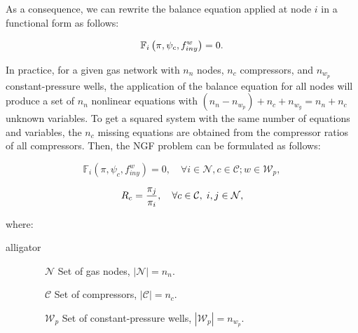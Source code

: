 As a consequence, we can rewrite the balance equation applied at node $i$ in a functional form as follows:

\begin{equation}
	\label{eq:balance_eq_funtional}
	\mathbb{F}_i\left(\pi,\psi_c,f_{iny}^{w}\right) = 0.
	\vspace{0.3cm}
\end{equation}

In practice, for a given gas network with $n_n$ nodes, $n_c$ compressors, and $n_{w_p}$ constant-pressure wells, the application of the balance equation for all nodes will produce a set of $n_n$ nonlinear equations with $(n_n-n_{w_p})+n_c+n_{w_g} = n_n+n_c$ unknown variables. To get a squared system with the same number of equations and variables, the $n_c$ missing equations are obtained from the compressor ratios of all compressors. Then, the NGF problem can be formulated as follows:

\begin{equation}
	\label{eq:F_i=0}
	\mathbb{F}_i\left(\pi,\psi_c,f_{iny}^{w}\right) = 0, \quad \forall i\in\mathcal{N}, c\in\mathcal{C}; w\in\mathcal{W}_p, 	
\end{equation}

\begin{equation}
	\label{eq:R_c=0}
	R_c = \frac{\pi_j}{\pi_i}, \quad \forall c\in\mathcal{C}, \;  i,j\in\mathcal{N},
	\vspace{0.3cm}
\end{equation}

where:

\begin{labeling}{alligator}
	\item [$\qquad \qquad  \mathcal{N}$]  \hspace{0.85cm} Set of gas nodes, $|\mathcal{N}|=n_n$.
	\item [$\qquad \qquad  \mathcal{C}$]  \hspace{1cm} Set of compressors, $|\mathcal{C}|=n_c$. 
	\item [$\qquad \qquad  \mathcal{W}_p$] \hspace{0.65cm} Set of constant-pressure wells, $|\mathcal{W}_p|=n_{w_p}$.	
\end{labeling}



